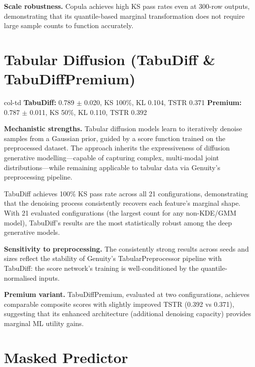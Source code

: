 \documentclass[11pt, a4paper]{report}
\begin{document}
\textbf{Scale robustness.} Copula achieves high KS pass rates even at 300-row outputs, demonstrating that its quantile-based marginal transformation does not require large sample counts to function accurately.

\section{\textcolor{col-td}{Tabular Diffusion (TabuDiff \& TabuDiffPremium)}}

\begin{modelbox}[title={\textbf{TabuDiff} --- 21 configurations \quad \textbf{TabuDiffPremium} --- 2 configurations}]{col-td}
\textbf{TabuDiff:} 0.789 $\pm$ 0.020, KS 100\%, KL 0.104, TSTR 0.371 \quad
\textbf{Premium:} 0.787 $\pm$ 0.011, KS 50\%, KL 0.110, TSTR 0.392
\end{modelbox}

\textbf{Mechanistic strengths.} Tabular diffusion models learn to iteratively denoise samples from a Gaussian prior, guided by a score function trained on the preprocessed dataset. The approach inherits the expressiveness of diffusion generative modelling---capable of capturing complex, multi-modal joint distributions---while remaining applicable to tabular data via Genuity's preprocessing pipeline.

TabuDiff achieves 100\% KS pass rate across all 21 configurations, demonstrating that the denoising process consistently recovers each feature's marginal shape. With 21 evaluated configurations (the largest count for any non-KDE/GMM model), TabuDiff's results are the most statistically robust among the deep generative models.

\textbf{Sensitivity to preprocessing.} The consistently strong results across seeds and sizes reflect the stability of Genuity's TabularPreprocessor pipeline with TabuDiff: the score network's training is well-conditioned by the quantile-normalised inputs.

\textbf{Premium variant.} TabuDiffPremium, evaluated at two configurations, achieves comparable composite scores with slightly improved TSTR (0.392 vs 0.371), suggesting that its enhanced architecture (additional denoising capacity) provides marginal ML utility gains.

\section{\textcolor{col-mp}{Masked Predictor}}
\end{document}
